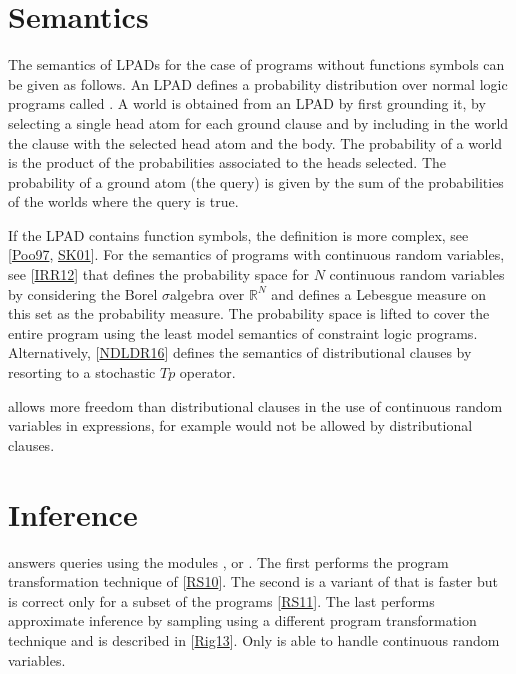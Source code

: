 \documentclass[letterpaper,10pt,english]{sphinxmanual}
\begin{document}
\chapter{Semantics}
\label{\detokenize{index:semantics}}
\sphinxAtStartPar
The semantics of LPADs for the case of programs without functions symbols can be given as follows.
An LPAD defines a probability distribution over normal logic programs called .
A world is obtained from an LPAD by first grounding it, by selecting a single head atom for each ground clause and by including in the world the clause with the selected head atom and the body.
The probability of a world is the product of the probabilities associated to the heads selected.
The probability of a ground atom (the query) is given by the sum of the probabilities of the worlds where the query is true.

\sphinxAtStartPar
If the LPAD contains function symbols, the definition is more complex, see {[}\hyperlink{cite.index:id50}{Poo97}, \hyperlink{cite.index:id51}{SK01}{]}.
For the semantics of programs with continuous random variables, see {[}\hyperlink{cite.index:id52}{IRR12}{]} that defines the probability space for \(N\) continuous random variables by considering the Borel \(\sigma\)\sphinxhyphen{}algebra over \(\mathbb{R}^N\) and defines a Lebesgue measure on this set as the probability measure.
The probability space is lifted to cover the entire program using the least model semantics of constraint logic programs.
Alternatively, {[}\hyperlink{cite.index:id49}{NDLDR16}{]} defines the semantics of distributional clauses by resorting to a stochastic \(Tp\) operator.

\sphinxAtStartPar
{} allows more freedom than distributional clauses in the use of continuous random variables in expressions,
for example  would not be allowed by distributional clauses.


\chapter{Inference}
\label{\detokenize{index:inference}}
\sphinxAtStartPar
{} answers queries using the modules ,  or .
The first performs the program transformation technique of {[}\hyperlink{cite.index:id53}{RS10}{]}.
The second is a variant of  that is faster but is correct only
for a subset of the programs {[}\hyperlink{cite.index:id70}{RS11}{]}.
The last performs approximate inference by sampling using a different program transformation technique and is described in {[}\hyperlink{cite.index:id54}{Rig13}{]}.
Only  is able to handle continuous random variables.
\end{document}
